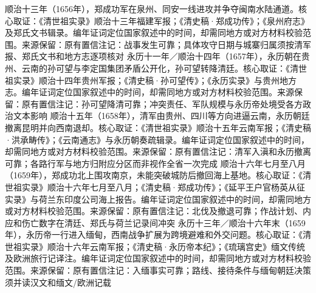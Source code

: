 顺治十三年（1656年），郑成功军在泉州、同安一线进攻并争夺闽南水陆通道。核心取证：《清世祖实录》顺治十三年福建军报；《清史稿·郑成功传》；《泉州府志》及郑氏文书辑录。编年证词定位国家叙述中的时间，却需同地方或对方材料校验范围。来源保留：原有置信注记：战事发生可靠；具体攻守日期与城寨归属须按清军报、郑氏文书和地方志逐项核对
永历十一年／顺治十四年（1657年），永历朝在贵州、云南的孙可望与李定国集团矛盾公开化，孙可望转降清廷。核心取证：《清世祖实录》顺治十四年贵州军报；《清史稿·孙可望传》；《永历实录》与贵州地方志。编年证词定位国家叙述中的时间，却需同地方或对方材料校验范围。来源保留：原有置信注记：孙可望降清可靠；冲突责任、军队规模与永历帝处境受各方政治文本影响
顺治十五年（1658年），清军由贵州、四川等方向进逼云南，永历朝廷撤离昆明并向西南退却。核心取证：《清世祖实录》顺治十五年云南军报；《清史稿·洪承畴传》；《云南通志》与永历朝奏疏辑录。编年证词定位国家叙述中的时间，却需同地方或对方材料校验范围。来源保留：原有置信注记：清军入滇和永历撤离可靠；各路行军与地方归附应分区而非视作全省一次完成
顺治十六年七月至八月（1659年），郑成功北上围攻南京，未能突破城防后撤回海上基地。核心取证：《清世祖实录》顺治十六年七月至八月；《清史稿·郑成功传》；《延平王户官杨英从征实录》与荷兰东印度公司海上报告。编年证词定位国家叙述中的时间，却需同地方或对方材料校验范围。来源保留：原有置信注记：北伐及撤退可靠；作战计划、内应和伤亡数字在清廷、郑氏与荷兰记录间冲突
永历十三年／顺治十六年末（1659年），永历帝一行进入缅甸，西南战争扩展为跨境避难和外交问题。核心取证：《清世祖实录》顺治十六年云南军报；《清史稿·永历帝本纪》；《琉璃宫史》缅文传统及欧洲旅行记译注。编年证词定位国家叙述中的时间，却需同地方或对方材料校验范围。来源保留：原有置信注记：入缅事实可靠；路线、接待条件与缅甸朝廷决策须并读汉文和缅文/欧洲记载

